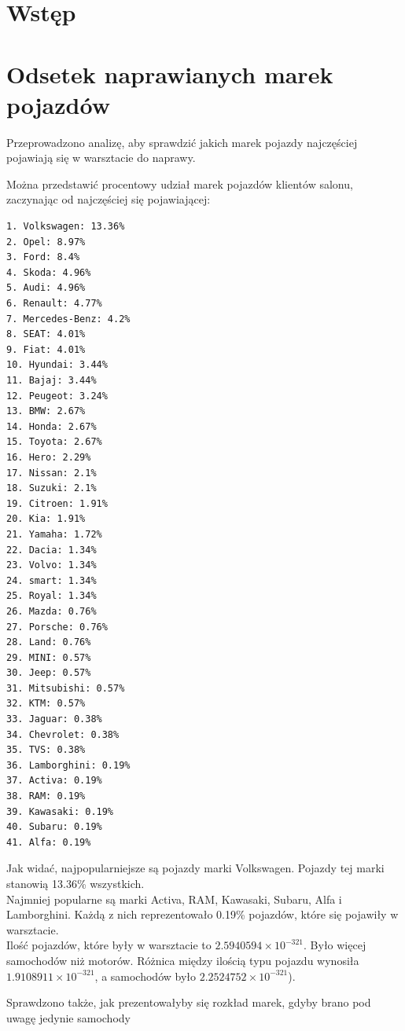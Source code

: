 \documentclass{article}\usepackage[]{graphicx}\usepackage[]{xcolor}
\begin{document}
\section{Wstęp}

\section{Odsetek naprawianych marek pojazdów}

Przeprowadzono analizę, aby sprawdzić jakich marek pojazdy najczęściej pojawiają się w warsztacie do naprawy. 



Można przedstawić procentowy udział marek pojazdów klientów salonu, zaczynając od najczęściej się pojawiającej:

\begin{verbatim}
1. Volkswagen: 13.36%
2. Opel: 8.97%
3. Ford: 8.4%
4. Skoda: 4.96%
5. Audi: 4.96%
6. Renault: 4.77%
7. Mercedes-Benz: 4.2%
8. SEAT: 4.01%
9. Fiat: 4.01%
10. Hyundai: 3.44%
11. Bajaj: 3.44%
12. Peugeot: 3.24%
13. BMW: 2.67%
14. Honda: 2.67%
15. Toyota: 2.67%
16. Hero: 2.29%
17. Nissan: 2.1%
18. Suzuki: 2.1%
19. Citroen: 1.91%
20. Kia: 1.91%
21. Yamaha: 1.72%
22. Dacia: 1.34%
23. Volvo: 1.34%
24. smart: 1.34%
25. Royal: 1.34%
26. Mazda: 0.76%
27. Porsche: 0.76%
28. Land: 0.76%
29. MINI: 0.57%
30. Jeep: 0.57%
31. Mitsubishi: 0.57%
32. KTM: 0.57%
33. Jaguar: 0.38%
34. Chevrolet: 0.38%
35. TVS: 0.38%
36. Lamborghini: 0.19%
37. Activa: 0.19%
38. RAM: 0.19%
39. Kawasaki: 0.19%
40. Subaru: 0.19%
41. Alfa: 0.19%
\end{verbatim}

Jak widać, najpopularniejsze są pojazdy marki Volkswagen. Pojazdy tej marki stanowią 13.36\% wszystkich. \\

Najmniej popularne są marki Activa, RAM, Kawasaki, Subaru, Alfa i Lamborghini. Każdą z nich reprezentowało 0.19\% pojazdów, które się pojawiły w warsztacie. \\

Ilość pojazdów, które były w warsztacie to \ensuremath{2.5940594\times 10^{-321}}. Było więcej samochodów niż motorów. Różnica między ilością typu pojazdu wynosiła \ensuremath{1.9108911\times 10^{-321}}, a samochodów było \ensuremath{2.2524752\times 10^{-321}}).

Sprawdzono także, jak prezentowałyby się rozkład marek, gdyby brano pod uwagę jedynie samochody
\end{document}
